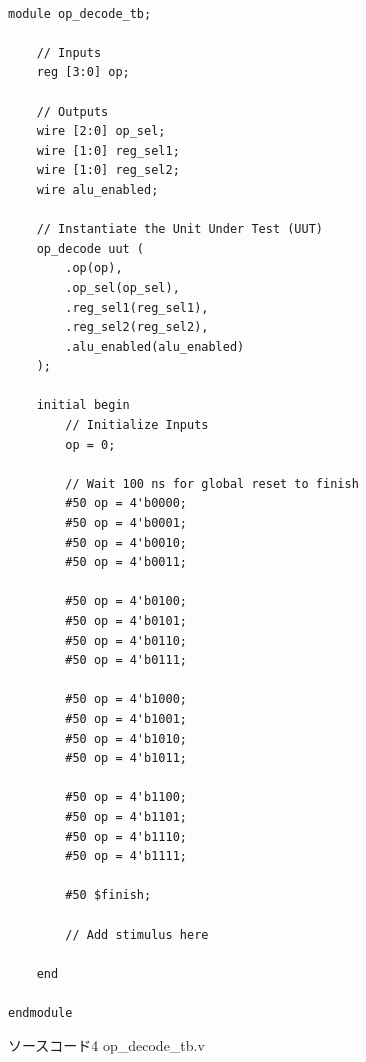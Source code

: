 \documentclass[12pt]{jreport}
\begin{document}
        \begin{center}
            \begin{lstlisting}[basicstyle=\ttfamily\footnotesize, frame=single]

module op_decode_tb;

    // Inputs
    reg [3:0] op;

    // Outputs
    wire [2:0] op_sel;
    wire [1:0] reg_sel1;
    wire [1:0] reg_sel2;
    wire alu_enabled;

    // Instantiate the Unit Under Test (UUT)
    op_decode uut (
        .op(op), 
        .op_sel(op_sel), 
        .reg_sel1(reg_sel1), 
        .reg_sel2(reg_sel2), 
        .alu_enabled(alu_enabled)
    );

    initial begin
        // Initialize Inputs
        op = 0;

        // Wait 100 ns for global reset to finish
        #50 op = 4'b0000;
        #50 op = 4'b0001;
        #50 op = 4'b0010;
        #50 op = 4'b0011;

        #50 op = 4'b0100;
        #50 op = 4'b0101;
        #50 op = 4'b0110;
        #50 op = 4'b0111;

        #50 op = 4'b1000;
        #50 op = 4'b1001;
        #50 op = 4'b1010;
        #50 op = 4'b1011;

        #50 op = 4'b1100;
        #50 op = 4'b1101;
        #50 op = 4'b1110;
        #50 op = 4'b1111;

        #50 $finish;
        
        // Add stimulus here

    end
      
endmodule
            \end{lstlisting}
            ソースコード4 op\_decode\_tb.v
        \end{center}
\end{document}
